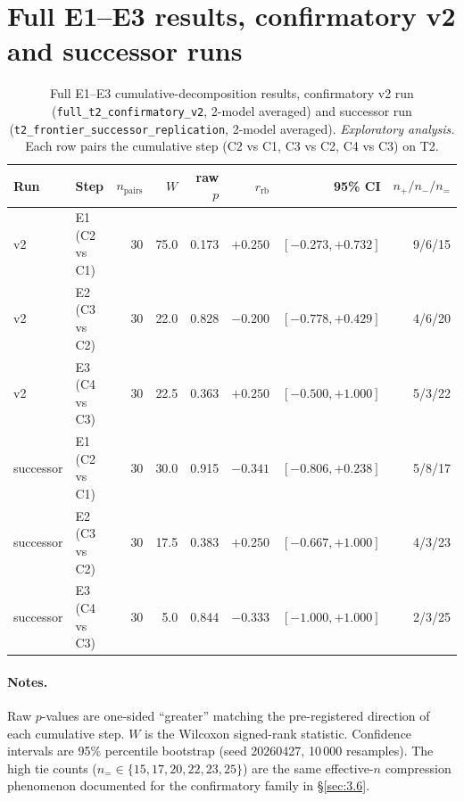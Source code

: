 
\section{Full E1--E3 results, confirmatory v2 and successor runs}
\label{app:C}

\begin{table}[h]
\centering
\small
\caption{Full E1--E3 cumulative-decomposition results, confirmatory v2 run
(\texttt{full\_t2\_confirmatory\_v2}, 2-model averaged) and successor run
(\texttt{t2\_frontier\_successor\_replication}, 2-model averaged).
\textit{Exploratory analysis.} Each row pairs the cumulative step
(C2 vs C1, C3 vs C2, C4 vs C3) on T2.}
\label{tab:appendix-c-e1-e3}
\begin{tabular}{llrrrrrr}
\toprule
Run & Step & $n_{\text{pairs}}$ & $W$ & raw $p$ & $r_{\text{rb}}$ & 95\% CI & $n_{+}/n_{-}/n_{=}$ \\
\midrule
v2        & E1 (C2 vs C1) & 30 & 75.0 & 0.173 & $+0.250$ & $[-0.273, +0.732]$ & 9/6/15 \\
v2        & E2 (C3 vs C2) & 30 & 22.0 & 0.828 & $-0.200$ & $[-0.778, +0.429]$ & 4/6/20 \\
v2        & E3 (C4 vs C3) & 30 & 22.5 & 0.363 & $+0.250$ & $[-0.500, +1.000]$ & 5/3/22 \\
\midrule
successor & E1 (C2 vs C1) & 30 & 30.0 & 0.915 & $-0.341$ & $[-0.806, +0.238]$ & 5/8/17 \\
successor & E2 (C3 vs C2) & 30 & 17.5 & 0.383 & $+0.250$ & $[-0.667, +1.000]$ & 4/3/23 \\
successor & E3 (C4 vs C3) & 30 &  5.0 & 0.844 & $-0.333$ & $[-1.000, +1.000]$ & 2/3/25 \\
\bottomrule
\end{tabular}
\end{table}

\paragraph{Notes.}
Raw $p$-values are one-sided ``greater'' matching the pre-registered
direction of each cumulative step. $W$ is the Wilcoxon signed-rank
statistic. Confidence intervals are 95\% percentile bootstrap
(seed 20260427, 10\,000 resamples). The high tie counts ($n_{=} \in
\{15, 17, 20, 22, 23, 25\}$) are the same effective-$n$ compression
phenomenon documented for the confirmatory family in \S\ref{sec:3.6}.
